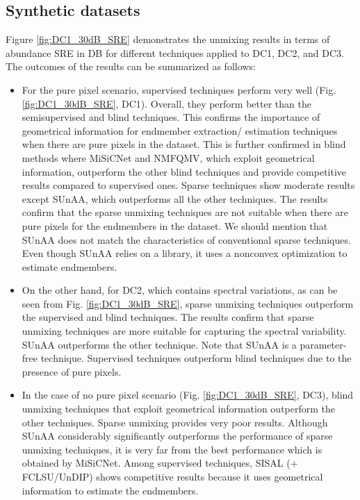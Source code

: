 \subsection{Synthetic datasets}

Figure \ref{fig:DC1_30dB_SRE} demonstrates the unmixing results in terms of abundance SRE in DB for different techniques applied to DC1, DC2, and DC3. The outcomes of the results can be summarized as follows: 
\begin{itemize}
    \item For the pure pixel scenario, supervised techniques perform very well (Fig. \ref{fig:DC1_30dB_SRE}, DC1). Overall, they perform better than the semisupervised and blind techniques. This confirms the importance of geometrical information for endmember extraction/ estimation techniques when there are pure pixels in the dataset. This is further confirmed in blind methods where MiSiCNet and NMFQMV, which exploit geometrical information, outperform the other blind techniques and provide competitive results compared to supervised ones. Sparse techniques show moderate results except SUnAA, which outperforms all the other techniques. The results confirm that the sparse unmixing techniques are not suitable when there are pure pixels for the endmembers in the dataset. We should mention that SUnAA does not match the characteristics of conventional sparse techniques. Even though SUnAA relies on a library, it uses a nonconvex optimization to estimate endmembers. 
    \item On the other hand, for DC2, which contains spectral variations, as can be seen from Fig. \ref{fig:DC1_30dB_SRE}, sparse unmixing techniques outperform the supervised and blind techniques. The results confirm that sparse unmixing techniques are more suitable for capturing the spectral variability. SUnAA outperforms the other technique. Note that SUnAA is a parameter-free technique. Supervised techniques outperform blind techniques due to the presence of pure pixels. 
    \item In the case of no pure pixel scenario (Fig. \ref{fig:DC1_30dB_SRE}, DC3), blind unmixing techniques that exploit geometrical information outperform the other techniques. Sparse unmixing provides very poor results. Although SUnAA considerably significantly outperforms the performance of sparse unmixing techniques, it is very far from the best performance which is obtained by MiSiCNet. Among supervised techniques, SISAL (+ FCLSU/UnDIP) shows competitive results because it uses geometrical information to estimate the endmembers.  
\end{itemize}


